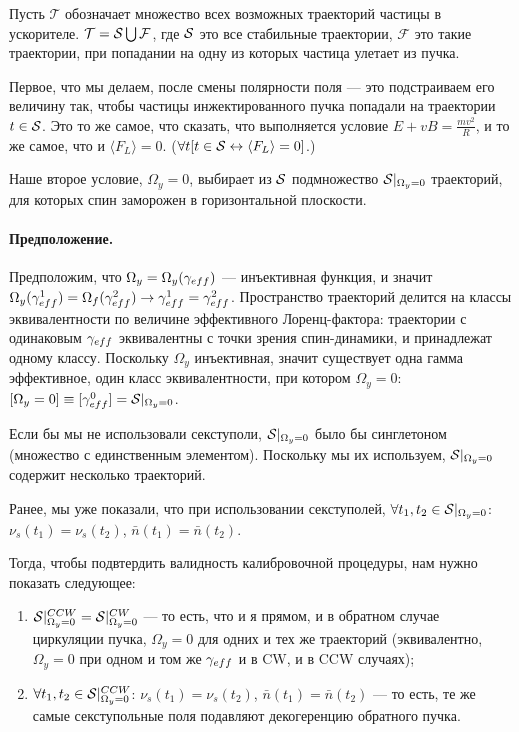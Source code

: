 \documentclass[a4paper,14pt]{article}
\newcommand{\Traj}{\mathcal T}
\newcommand{\Fail}{\mathcal F}
\newcommand{\avg}[1]{\langle {#1} \rangle}
\newcommand{\W}{\Omega}
\newcommand{\nbar}{\bar n}
\begin{document}
Пусть $\Traj$ обозначает множество всех возможных траекторий частицы в ускорителе. $\Traj = \Stab \bigcup \Fail$,
где $\Stab$ это все стабильные траектории, $\Fail$ это такие траектории, при попадании на одну из которых
частица улетает из пучка.

Первое, что мы делаем, после смены полярности поля --- это подстраиваем его величину так, чтобы частицы
инжектированного пучка попадали на траектории $t\in \Stab$. Это то же самое, что сказать, что выполняется
условие $E + vB = \frac{mv^2}{R}$, и то же самое, что и $\avg{F_L} = 0$.
($\forall t [t\in\Stab \leftrightarrow \avg{F_L} = 0]$.)

Наше второе условие, $\W_y = 0$, выбирает из $\Stab$ подмножество $\Stab*$ траекторий,
для которых спин заморожен в горизонтальной плоскости.

\paragraph{Предположение.}
Предположим, что $\W_y = \W_y(\g*)$ --- инъективная функция,
и значит $\W_y(\g*^1) = \W_f(\g*^2) \rightarrow \g*^1 = \g*^2$. Пространство траекторий делится на
классы эквивалентности по величине эффективного Лоренц-фактора: траектории с одинаковым $\g*$ эквивалентны
с точки зрения спин-динамики, и принадлежат одному классу. Поскольку $\W_y$ инъективная, значит существует
одна гамма эффективное, один класс эквивалентности, при котором $\W_y=0$: $[\W_y=0]\equiv [\g*^0] = \Stab*$.

Если бы мы не использовали секступоли, $\Stab*$ было бы синглетоном (множество с единственным элементом).
Поскольку мы их используем, $\Stab*$ содержит несколько траекторий.

Ранее, мы уже показали, что при использовании секступолей, $\forall t_1,t_2\in\Stab*$:
$\nu_s(t_1) = \nu_s(t_2)$, $\nbar(t_1) = \nbar(t_2)$.

Тогда, чтобы подвтердить валидность калибровочной процедуры, нам нужно показать следующее:
\begin{enumerate}
\item $\Stab*^{CCW} = \Stab*^{CW}$ --- то есть, что и я прямом, и в обратном случае циркуляции пучка,
  $\W_y = 0$ для одних и тех же траекторий (эквивалентно, $\W_y=0$ при одном и том же $\g*$ и в CW, и в CCW
  случаях);
\item $\forall t_1,t_2\in\Stab*^{CCW}$: $\nu_s(t_1) = \nu_s(t_2)$, $\nbar(t_1) = \nbar(t_2)$ ---
  то есть, те же самые секступольные поля подавляют декогеренцию обратного пучка.
\end{enumerate}
\end{document}
